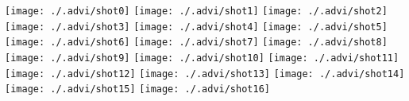 \documentclass[12pt]{article}
\begin{document}
\texttt{[image: ./.advi/shot0]}
\texttt{[image: ./.advi/shot1]}
\texttt{[image: ./.advi/shot2]}
\texttt{[image: ./.advi/shot3]}
\texttt{[image: ./.advi/shot4]}
\texttt{[image: ./.advi/shot5]}
\texttt{[image: ./.advi/shot6]}
\texttt{[image: ./.advi/shot7]}
\texttt{[image: ./.advi/shot8]}
\texttt{[image: ./.advi/shot9]}
\texttt{[image: ./.advi/shot10]}
\texttt{[image: ./.advi/shot11]}
\texttt{[image: ./.advi/shot12]}
\texttt{[image: ./.advi/shot13]}
\texttt{[image: ./.advi/shot14]}
\texttt{[image: ./.advi/shot15]}
\texttt{[image: ./.advi/shot16]}
\end{document}
